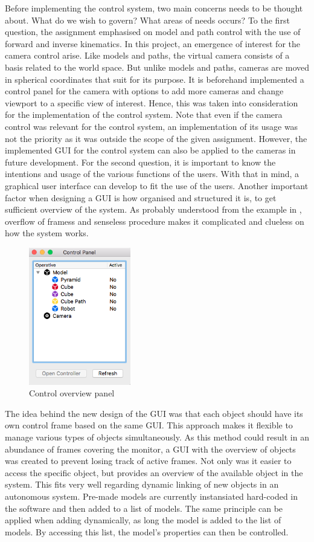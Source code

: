 Before implementing the control system, two main concerns needs to be thought about. What do we wish to govern? What areas of needs occurs? To the first question, the assignment emphasised on model and path control with the use of forward and inverse kinematics. In this project, an emergence of interest for the camera control arise. Like models and paths, the virtual camera consists of a basis related to the world space.  But unlike models and paths, cameras are moved in spherical coordinates that suit for its purpose. It is beforehand implemented a control panel for the camera with options to add more cameras and change viewport to a specific view of interest. Hence, this was taken into consideration for the implementation of the control system. Note that even if the camera control was relevant for the control system, an implementation of its usage was not the priority as it was outside the scope of the given assignment. However, the implemented GUI for the control system can also be applied to the cameras in future development. For the second question, it is important to know the intentions and usage of the various functions of the users. With that in mind, a graphical user interface can develop to fit the use of the users. Another important factor when designing a GUI is how organised and structured it is, to get sufficient overview of the system. As probably understood from the example in , overflow of framess and senseless procedure makes it complicated and clueless on how the system works.

\begin{figure}[ht]
    \centering
    \includegraphics[height=6cm]{images/control_overview.png}
    \caption[Control overview panel]{Control overview panel}
    \label{fig:ctroverview}
\end{figure}

The idea behind the new design of the GUI was that each object should have its own control frame based on the same GUI. This approach makes it flexible to manage various types of objects simultaneously. As this method could result in an abundance of frames covering the monitor, a GUI with the overview of objects was created to prevent losing track of active frames. Not only was it easier to access the specific object, but provides an overview of the available object in the system. This fits very well regarding dynamic linking of new objects in an autonomous system. Pre-made models are currently instansiated hard-coded in the software and then added to a list of models. The same principle can be applied when adding dynamically, as long the model is added to the list of models. By accessing this list, the model's properties can then be controlled. 

